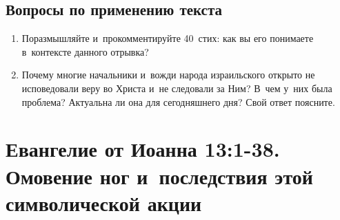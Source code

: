 \documentclass[a4paper,12pt]{article}
\begin{document}
\subsection*{Вопросы по применению текста} 
\begin{enumerate}
    \item Поразмышляйте и~прокомментируйте 40~стих: как вы его понимаете в~контексте данного отрывка? 
    
    \myline
    
    \myline
    \item Почему многие начальники и~вожди народа израильского открыто не исповедовали веру во Христа и~не следовали за Ним? В~чем у~них была проблема? Актуальна ли она для сегодняшнего дня? Свой ответ поясните. 
    
    \myline
    
    \myline
\end{enumerate}



\section{Евангелие от Иоанна 13:1-38. Омовение ног и~последствия этой символической акции}
\end{document}
